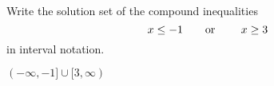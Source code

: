 

Write the solution set of the compound inequalities
\[x\leq -1 \text{\quad\quad or \quad\quad} x\geq 3 \]
in interval notation.

\begin{solution}
$(-\infty, -1]\cup [3, \infty)$
\end{solution}